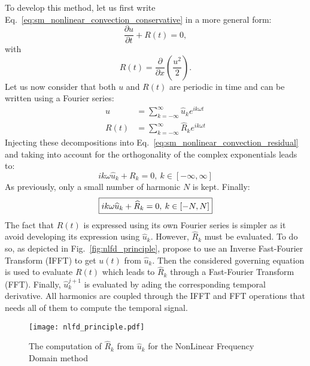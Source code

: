 To develop this method, let us first 
write Eq.~\ref{eq:sm_nonlinear_convection_conservative} 
in a more general form:
\begin{equation}
	\frac{\partial u}{\partial t} + R (t) = 0,
	\label{eq:sm_nonlinear_convection_residual}
\end{equation}
with
\begin{equation}
	R(t) = \frac{\partial}{\partial x} \left( 
	\frac{u^2}{2} \right).
\end{equation}
Let us now consider that both $u$ and $R(t)$ are periodic
in time and can be written using a Fourier series:
\begin{equation}
	\begin{split}
		u &= \sum_{k=-\infty}^{\infty} \widehat{u}_k e^{i k \omega t} \\
		R(t) &= \sum_{k=-\infty}^{\infty} \widehat{R}_k e^{i k \omega t}
	\end{split}
\end{equation}
Injecting these decompositions into 
Eq.~\ref{eq:sm_nonlinear_convection_residual} and taking into account
for the orthogonality of the complex exponentials leads to:
\begin{equation}
	i k \omega \widehat{u}_k + R_k = 0, \: k \in [-\infty, \infty]
\end{equation}
As previously, only a small number of harmonic $N$ is kept.
Finally:
\begin{equation}
	\fbox{$
	i k \omega \widehat{u}_k + \widehat{R}_k = 0, \: k \in [-N, N]
	$}
	\label{eq:sm_nlfd_subset_eq}
\end{equation}
The fact that $R(t)$ is expressed using its own Fourier series is 
simpler as it avoid developing its expression using $\widehat{u}_k$.
However, $\widehat{R}_k$ must be evaluated. To do so, as depicted
in Fig.~\ref{fig:nlfd_principle}, \citet{McMullen2001}
propose to use an Inverse Fast-Fourier Transform (IFFT) to get
$u(t)$ from $\widehat{u}_k$. Then the considered governing equation
is used to evaluate $R(t)$ which leads to $\widehat{R}_k$
through a Fast-Fourier Transform (FFT). Finally, $\widehat{u}_k^{j+1}$
is evaluated by ading the corresponding temporal derivative. All
harmonics are coupled through the IFFT and FFT operations
that needs all of them to compute the temporal signal.
\begin{figure}[htbp]
  \centering
  \texttt{[image: nlfd\_principle.pdf]}
  \caption{The computation of $\widehat{R}_k$ from $\widehat{u}_k$
  for the NonLinear Frequency Domain method}
  \label{fig:nlfd_principle_1}
\end{figure}

